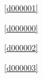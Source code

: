 ﻿



\noindent\treeindexnumbernameone\ \ref{d000001}\dotfill\pageref{d000001}%

\noindent\treeindexnumbernameone\ \ref{d000000}\dotfill\pageref{d000000}%

\noindent\treeindexnumbernameone\ \ref{d000002}\dotfill\pageref{d000002}%

\noindent\treeindexnumbernameone\ \ref{d000003}\dotfill\pageref{d000003}%









